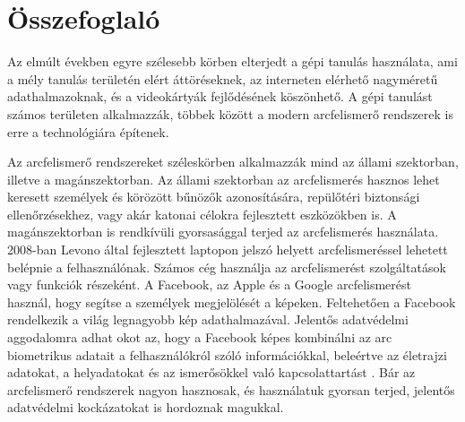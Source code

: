 \section{Összefoglaló}




Az elmúlt években egyre szélesebb körben elterjedt a gépi tanulás használata, ami a mély tanulás területén elért áttöréseknek, az interneten elérhető nagyméretű adathalmazoknak, és a videokártyák fejlődésének köszönhető. A gépi tanulást számos területen alkalmazzák, többek között a modern arcfelismerő rendszerek is erre a technológiára építenek. 

Az arcfelismerő rendszereket széleskörben alkalmazzák mind az állami szektorban, illetve a magánszektorban. Az állami szektorban az arcfelismerés hasznos lehet keresett személyek és körözött bűnözők azonosítására, repülőtéri biztonsági ellenőrzésekhez, vagy akár katonai célokra fejlesztett eszközökben is. A magánszektorban is rendkívüli gyorsasággal terjed az arcfelismerés használata. 2008-ban Levono által fejlesztett laptopon jelszó helyett arcfelismeréssel lehetett belépnie a felhasználónak. Számos cég használja az arcfelismerést szolgáltatások vagy funkciók részeként. A Facebook, az Apple és a Google arcfelismerést használ, hogy segítse a személyek megjelölését a képeken. Feltehetően a Facebook rendelkezik a világ legnagyobb kép adathalmazával. Jelentős adatvédelmi aggodalomra adhat okot az, hogy a Facebook képes kombinálni az arc biometrikus adatait a felhasználókról szóló információkkal, beleértve az életrajzi adatokat, a helyadatokat és az ismerősökkel való kapcsolattartást \cite{public_private_fr}. Bár az arcfelismerő rendszerek nagyon hasznosak, és használatuk gyorsan terjed, jelentős adatvédelmi kockázatokat is hordoznak magukkal. 

